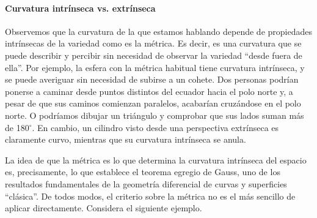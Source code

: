 \paragraph{Curvatura intrínseca vs. extrínseca} Observemos que la curvatura de la que estamos hablando depende de propiedades intrínsecas de la variedad como es la métrica. Es decir, es una curvatura que se puede describir y percibir sin necesidad de observar la variedad ``desde fuera de ella''. Por ejemplo, la esfera con la métrica habitual tiene curvatura intrínseca, y se puede averiguar sin necesidad de subirse a un cohete. Dos personas podrían ponerse a caminar desde puntos distintos del ecuador hacia el polo norte y, a pesar de que sus caminos comienzan paralelos, acabarían cruzándose en el polo norte. O podríamos dibujar un triángulo y comprobar que sus lados suman más de 180\(^\circ\). En cambio, un cilindro visto desde una perspectiva extrínseca es claramente curvo, mientras que su curvatura intrínseca se anula. 

La idea de que la métrica es lo que determina la curvatura intrínseca del espacio es, precisamente, lo que establece el teorema egregio de Gauss, uno de los resultados fundamentales de la geometría diferencial de curvas y superficies ``clásica''. De todos modos, el criterio sobre la métrica no es el más sencillo de aplicar directamente. Considera el siguiente ejemplo.

